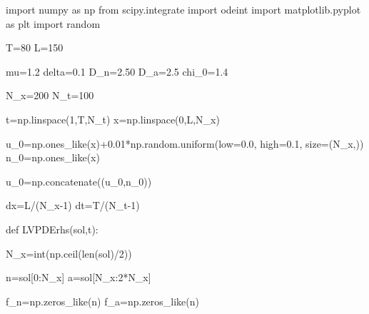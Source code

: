 \documentclass[
  letterpaper,
  DIV=11,
  numbers=noendperiod]{scrreprt}
\newenvironment{Shaded}{\begin{snugshade}}{\end{snugshade}}
\newcommand{\BuiltInTok}[1]{\textcolor[rgb]{0.00,0.23,0.31}{#1}}
\newcommand{\DecValTok}[1]{\textcolor[rgb]{0.68,0.00,0.00}{#1}}
\newcommand{\FloatTok}[1]{\textcolor[rgb]{0.68,0.00,0.00}{#1}}
\newcommand{\ImportTok}[1]{\textcolor[rgb]{0.00,0.46,0.62}{#1}}
\newcommand{\KeywordTok}[1]{\textcolor[rgb]{0.00,0.23,0.31}{#1}}
\newcommand{\NormalTok}[1]{\textcolor[rgb]{0.00,0.23,0.31}{#1}}
\newcommand{\OperatorTok}[1]{\textcolor[rgb]{0.37,0.37,0.37}{#1}}
\theoremstyle{plain}
\theoremstyle{definition}
\theoremstyle{plain}
\theoremstyle{remark}
\begin{document}
\begin{Shaded}
\begin{Highlighting}[]
\ImportTok{import}\NormalTok{ numpy }\ImportTok{as}\NormalTok{ np}
\ImportTok{from}\NormalTok{ scipy.integrate }\ImportTok{import}\NormalTok{ odeint}
\ImportTok{import}\NormalTok{ matplotlib.pyplot }\ImportTok{as}\NormalTok{ plt}
\ImportTok{import}\NormalTok{ random}


\NormalTok{T}\OperatorTok{=}\DecValTok{80}
\NormalTok{L}\OperatorTok{=}\DecValTok{150}

\NormalTok{mu}\OperatorTok{=}\FloatTok{1.2}
\NormalTok{delta}\OperatorTok{=}\FloatTok{0.1}
\NormalTok{D\_n}\OperatorTok{=}\FloatTok{2.50}
\NormalTok{D\_a}\OperatorTok{=}\FloatTok{2.5}
\NormalTok{chi\_0}\OperatorTok{=}\FloatTok{1.4}

\NormalTok{N\_x}\OperatorTok{=}\DecValTok{200}
\NormalTok{N\_t}\OperatorTok{=}\DecValTok{100}

\NormalTok{t}\OperatorTok{=}\NormalTok{np.linspace(}\DecValTok{1}\NormalTok{,T,N\_t)}
\NormalTok{x}\OperatorTok{=}\NormalTok{np.linspace(}\DecValTok{0}\NormalTok{,L,N\_x)}

\NormalTok{u\_0}\OperatorTok{=}\NormalTok{np.ones\_like(x)}\OperatorTok{+}\FloatTok{0.01}\OperatorTok{*}\NormalTok{np.random.uniform(low}\OperatorTok{=}\FloatTok{0.0}\NormalTok{, high}\OperatorTok{=}\FloatTok{0.1}\NormalTok{, size}\OperatorTok{=}\NormalTok{(N\_x,))}
\NormalTok{n\_0}\OperatorTok{=}\NormalTok{np.ones\_like(x)}

\NormalTok{u\_0}\OperatorTok{=}\NormalTok{np.concatenate((u\_0,n\_0))}

\NormalTok{dx}\OperatorTok{=}\NormalTok{L}\OperatorTok{/}\NormalTok{(N\_x}\OperatorTok{{-}}\DecValTok{1}\NormalTok{)}
\NormalTok{dt}\OperatorTok{=}\NormalTok{T}\OperatorTok{/}\NormalTok{(N\_t}\OperatorTok{{-}}\DecValTok{1}\NormalTok{)}

\KeywordTok{def}\NormalTok{ LVPDErhs(sol,t):}

\NormalTok{    N\_x}\OperatorTok{=}\BuiltInTok{int}\NormalTok{(np.ceil(}\BuiltInTok{len}\NormalTok{(sol)}\OperatorTok{/}\DecValTok{2}\NormalTok{))}

\NormalTok{    n}\OperatorTok{=}\NormalTok{sol[}\DecValTok{0}\NormalTok{:N\_x]}
\NormalTok{    a}\OperatorTok{=}\NormalTok{sol[N\_x:}\DecValTok{2}\OperatorTok{*}\NormalTok{N\_x]}



\NormalTok{    f\_n}\OperatorTok{=}\NormalTok{np.zeros\_like(n)}
\NormalTok{    f\_a}\OperatorTok{=}\NormalTok{np.zeros\_like(n)}


\end{Highlighting}
\end{Shaded}
\end{document}
